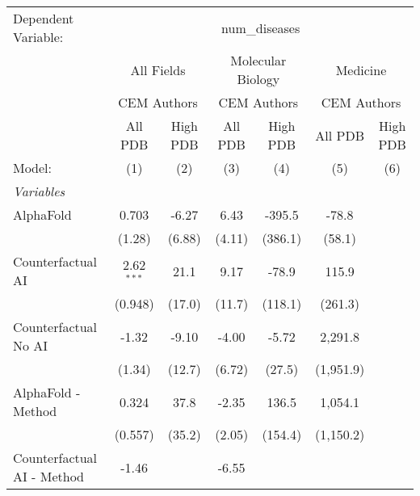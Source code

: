 \begingroup
\centering
\begin{tabular}{lcccccc}
   \tabularnewline \midrule \midrule
   Dependent Variable: & \multicolumn{6}{c}{num\_diseases}\\
 & \multicolumn{2}{c}{All Fields} & \multicolumn{2}{c}{Molecular Biology} & \multicolumn{2}{c}{Medicine} \\
\cmidrule(lr){2-3} \cmidrule(lr){4-5} \cmidrule(lr){6-7}
 & \multicolumn{2}{c}{CEM Authors} & \multicolumn{2}{c}{CEM Authors} & \multicolumn{2}{c}{CEM Authors} \\
\cmidrule(lr){2-3} \cmidrule(lr){4-5} \cmidrule(lr){6-7}
 & \multicolumn{1}{c}{All PDB} & \multicolumn{1}{c}{High PDB} & \multicolumn{1}{c}{All PDB} & \multicolumn{1}{c}{High PDB} & \multicolumn{1}{c}{All PDB} & \multicolumn{1}{c}{High PDB} \\
\cmidrule(lr){2-2} \cmidrule(lr){3-3} \cmidrule(lr){4-4} \cmidrule(lr){5-5} \cmidrule(lr){6-6} \cmidrule(lr){7-7}
   Model:                                                     & (1)          & (2)     & (3)       & (4)     & (5)       & (6)\\  
   \midrule
   \emph{Variables}\\
   AlphaFold                                                  & 0.703        & -6.27   & 6.43      & -395.5  & -78.8     &   \\   
                                                              & (1.28)       & (6.88)  & (4.11)    & (386.1) & (58.1)    &   \\   
   Counterfactual AI                                          & 2.62$^{***}$ & 21.1    & 9.17      & -78.9   & 115.9     &   \\   
                                                              & (0.948)      & (17.0)  & (11.7)    & (118.1) & (261.3)   &   \\   
   Counterfactual No AI                                       & -1.32        & -9.10   & -4.00     & -5.72   & 2,291.8   &   \\   
                                                              & (1.34)       & (12.7)  & (6.72)    & (27.5)  & (1,951.9) &   \\   
   AlphaFold - Method                                         & 0.324        & 37.8    & -2.35     & 136.5   & 1,054.1   &   \\   
                                                              & (0.557)      & (35.2)  & (2.05)    & (154.4) & (1,150.2) &   \\   
   Counterfactual AI - Method                                 & -1.46        &         & -6.55     &         &           &   \\   

\end{tabular}
